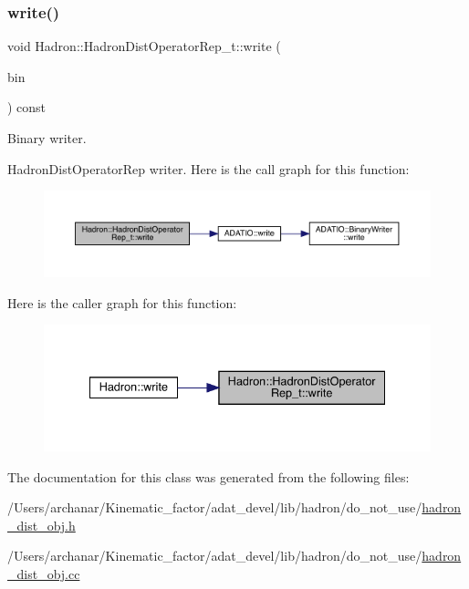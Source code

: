 \subsubsection{\texorpdfstring{write()}{write()}}
{\footnotesize\ttfamily void Hadron\+::\+Hadron\+Dist\+Operator\+Rep\+\_\+t\+::write (\begin{DoxyParamCaption}\item[{\mbox{\hyperlink{classADATIO_1_1BinaryWriter}{A\+D\+A\+T\+I\+O\+::\+Binary\+Writer}} \&}]{bin }\end{DoxyParamCaption}) const}



Binary writer. 

Hadron\+Dist\+Operator\+Rep writer. Here is the call graph for this function\+:\nopagebreak
\begin{figure}[H]
\begin{center}
\leavevmode
\includegraphics[width=350pt]{dd/de0/classHadron_1_1HadronDistOperatorRep__t_a13c4b6d851e65136c55ccee152e72a12_cgraph}
\end{center}
\end{figure}
Here is the caller graph for this function\+:\nopagebreak
\begin{figure}[H]
\begin{center}
\leavevmode
\includegraphics[width=335pt]{dd/de0/classHadron_1_1HadronDistOperatorRep__t_a13c4b6d851e65136c55ccee152e72a12_icgraph}
\end{center}
\end{figure}


The documentation for this class was generated from the following files\+:\begin{DoxyCompactItemize}
\item 
/\+Users/archanar/\+Kinematic\+\_\+factor/adat\+\_\+devel/lib/hadron/do\+\_\+not\+\_\+use/\mbox{\hyperlink{hadron__dist__obj_8h}{hadron\+\_\+dist\+\_\+obj.\+h}}\item 
/\+Users/archanar/\+Kinematic\+\_\+factor/adat\+\_\+devel/lib/hadron/do\+\_\+not\+\_\+use/\mbox{\hyperlink{hadron__dist__obj_8cc}{hadron\+\_\+dist\+\_\+obj.\+cc}}\end{DoxyCompactItemize}

